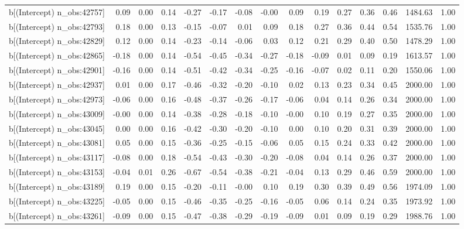 \begin{table}[ht]
\begin{tabular}{rrrrrrrrrrrrrrr}
  b[(Intercept) n\_obs:42757] & 0.09 & 0.00 & 0.14 & -0.27 & -0.17 & -0.08 & -0.00 & 0.09 & 0.19 & 0.27 & 0.36 & 0.46 & 1484.63 & 1.00 \\ 
  b[(Intercept) n\_obs:42793] & 0.18 & 0.00 & 0.13 & -0.15 & -0.07 & 0.01 & 0.09 & 0.18 & 0.27 & 0.36 & 0.44 & 0.54 & 1535.76 & 1.00 \\ 
  b[(Intercept) n\_obs:42829] & 0.12 & 0.00 & 0.14 & -0.23 & -0.14 & -0.06 & 0.03 & 0.12 & 0.21 & 0.29 & 0.40 & 0.50 & 1478.29 & 1.00 \\ 
  b[(Intercept) n\_obs:42865] & -0.18 & 0.00 & 0.14 & -0.54 & -0.45 & -0.34 & -0.27 & -0.18 & -0.09 & 0.01 & 0.09 & 0.19 & 1613.57 & 1.00 \\ 
  b[(Intercept) n\_obs:42901] & -0.16 & 0.00 & 0.14 & -0.51 & -0.42 & -0.34 & -0.25 & -0.16 & -0.07 & 0.02 & 0.11 & 0.20 & 1550.06 & 1.00 \\ 
  b[(Intercept) n\_obs:42937] & 0.01 & 0.00 & 0.17 & -0.46 & -0.32 & -0.20 & -0.10 & 0.02 & 0.13 & 0.23 & 0.34 & 0.45 & 2000.00 & 1.00 \\ 
  b[(Intercept) n\_obs:42973] & -0.06 & 0.00 & 0.16 & -0.48 & -0.37 & -0.26 & -0.17 & -0.06 & 0.04 & 0.14 & 0.26 & 0.34 & 2000.00 & 1.00 \\ 
  b[(Intercept) n\_obs:43009] & -0.00 & 0.00 & 0.14 & -0.38 & -0.28 & -0.18 & -0.10 & -0.00 & 0.10 & 0.19 & 0.27 & 0.35 & 2000.00 & 1.00 \\ 
  b[(Intercept) n\_obs:43045] & 0.00 & 0.00 & 0.16 & -0.42 & -0.30 & -0.20 & -0.10 & 0.00 & 0.10 & 0.20 & 0.31 & 0.39 & 2000.00 & 1.00 \\ 
  b[(Intercept) n\_obs:43081] & 0.05 & 0.00 & 0.15 & -0.36 & -0.25 & -0.15 & -0.06 & 0.05 & 0.15 & 0.24 & 0.33 & 0.42 & 2000.00 & 1.00 \\ 
  b[(Intercept) n\_obs:43117] & -0.08 & 0.00 & 0.18 & -0.54 & -0.43 & -0.30 & -0.20 & -0.08 & 0.04 & 0.14 & 0.26 & 0.37 & 2000.00 & 1.00 \\ 
  b[(Intercept) n\_obs:43153] & -0.04 & 0.01 & 0.26 & -0.67 & -0.54 & -0.38 & -0.21 & -0.04 & 0.13 & 0.29 & 0.46 & 0.59 & 2000.00 & 1.00 \\ 
  b[(Intercept) n\_obs:43189] & 0.19 & 0.00 & 0.15 & -0.20 & -0.11 & -0.00 & 0.10 & 0.19 & 0.30 & 0.39 & 0.49 & 0.56 & 1974.09 & 1.00 \\ 
  b[(Intercept) n\_obs:43225] & -0.05 & 0.00 & 0.15 & -0.46 & -0.35 & -0.25 & -0.16 & -0.05 & 0.06 & 0.14 & 0.24 & 0.35 & 1973.92 & 1.00 \\ 
  b[(Intercept) n\_obs:43261] & -0.09 & 0.00 & 0.15 & -0.47 & -0.38 & -0.29 & -0.19 & -0.09 & 0.01 & 0.09 & 0.19 & 0.29 & 1988.76 & 1.00 \\ 

\end{tabular}
\end{table}
